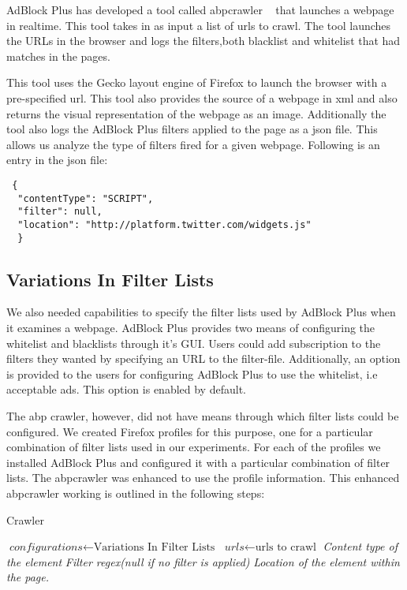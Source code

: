 AdBlock Plus has developed a tool called abpcrawler ~\cite{abpcrawler} that launches a webpage in realtime.
This tool takes in as input a list of urls to crawl. The tool launches the URLs in the browser and logs the filters,both blacklist and whitelist that had matches in the pages.

This tool uses the Gecko layout engine of Firefox to launch the browser with a pre-specified url. This tool also
provides the  source of a webpage in xml and also returns the visual representation of the webpage as an image.
Additionally the tool also logs the  AdBlock Plus filters applied to the page as a json file. This allows us analyze the type of filters fired for a given webpage. Following is an  entry in the json file:
\begin{lstlisting}
 {
  "contentType": "SCRIPT",
  "filter": null,
  "location": "http://platform.twitter.com/widgets.js"
  }
\end{lstlisting}
\subsection{Variations In Filter Lists}
We also needed capabilities to specify the filter lists used by AdBlock Plus when it examines a webpage.
AdBlock Plus provides two means of configuring the whitelist and blacklists through it's GUI. Users  could add subscription to the filters they wanted by specifying an  URL to the filter-file.
Additionally, an option is provided to the users for configuring AdBlock Plus to use the whitelist, i.e acceptable ads. This option is enabled by default.

The abp crawler, however, did not have means through which filter lists could be configured.
We created Firefox profiles for this purpose, one for a particular combination of filter lists used in our experiments. For each of the profiles we installed AdBlock Plus and configured it with a particular combination of filter lists.
The abpcrawler was enhanced to use the profile information.
This enhanced abpcrawler working is outlined in the following steps:
\begin{algorithm}
\caption{Crawler}\label{euclid}
\begin{algorithmic}[1]
\State $\textit{configurations} \gets \text{Variations In Filter Lists}$
\State $\textit{urls} \gets \text{urls to crawl}$
\State {}
\State {}
\State \textit{Content type of the element}
\State \textit{Filter regex(null if no filter is applied)}
\State \textit{Location of the element within the page.}
\EndFor
\EndFor
\Return
\EndProcedure
\end{algorithmic}
\end{algorithm}

